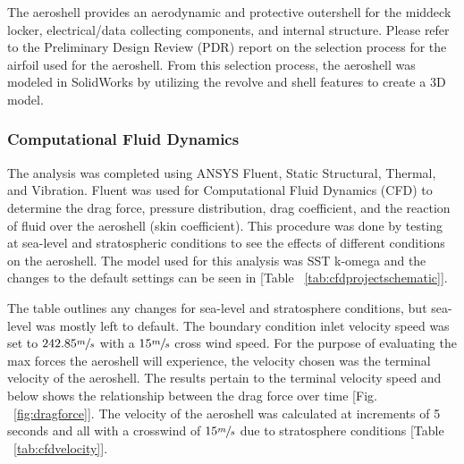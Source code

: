 \indent\indent The aeroshell provides an aerodynamic and protective outershell for the middeck locker, electrical/data collecting components, and internal structure. Please refer to the Preliminary Design Review (PDR) report on the selection process for the airfoil used for the aeroshell. From this selection process, the aeroshell was modeled in SolidWorks by utilizing the revolve and shell features to create a 3D model. 

\subsubsection*{Computational Fluid Dynamics}
\indent\indent The analysis was completed using ANSYS Fluent, Static Structural, Thermal, and Vibration. Fluent was used for Computational Fluid Dynamics (CFD) to determine the drag force, pressure distribution, drag coefficient, and the reaction of fluid over the aeroshell (skin coefficient). This procedure was done by testing at sea-level and stratospheric conditions to see the effects of different conditions on the aeroshell. The model used for this analysis was SST k-omega and the changes to the default settings can be seen in [Table ~\ref{tab:cfdprojectschematic}].

\begin{table}[H]
\caption{\label{tab:cfdprojectschematic}CFD sea-level and stratosphere parameter differences.}
\centering
{}
\end{table}

\indent\indent The table outlines any changes for sea-level and stratosphere conditions, but sea-level was mostly left to default. The boundary condition inlet velocity speed was set to $242.85 \sfrac{m}{s}$ with a $15 \sfrac{m}{s}$ cross wind speed. For the purpose of evaluating the max forces the aeroshell will experience, the velocity chosen was the terminal velocity of the aeroshell. The results pertain to the terminal velocity speed and below shows the relationship between the drag force over time [Fig. ~\ref{fig:dragforce}]. The velocity of the aeroshell was calculated at increments of 5 seconds and all with a crosswind of $15 \sfrac{m}{s}$ due to stratosphere conditions [Table ~\ref{tab:cfdvelocity}].

